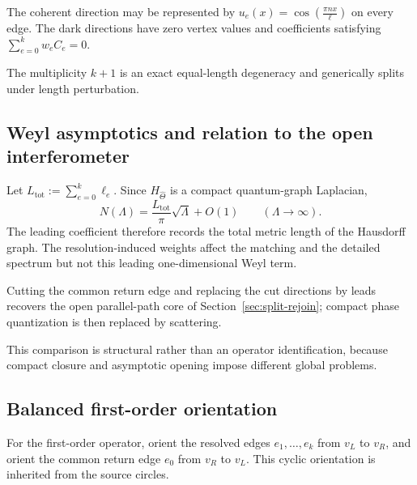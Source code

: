 \documentclass[11pt]{article}
\theoremstyle{plain}
\theoremstyle{definition}
\begin{document}
The coherent direction may be represented by \(u_e(x) = \cos \left( \frac{\pi n x}{\ell} \right)\) on every edge. The dark directions have zero vertex values and coefficients
satisfying
\(\sum_{e=0}^{k}w_eC_e=0\).

The multiplicity \(k+1\) is an exact equal-length degeneracy and generically splits under length perturbation.

\subsection{Weyl asymptotics and relation to the open interferometer}
\label{subsec:compact-theta-Weyl}
\label{subsec:compact-theta-cutting}
\label{subsec:compact-theta-open-comparison}

Let
\(L_{\mathrm{tot}} := \sum_{e=0}^{k}\ell_e\).
Since \(H_{\widehat\Theta}\) is a compact quantum-graph Laplacian,
\[
  N(\Lambda)
  =
  \frac{L_{\mathrm{tot}}}{\pi}
  \sqrt{\Lambda}
  +
  O(1)
  \qquad
  (\Lambda\to\infty).
\]
The leading coefficient therefore records the total metric length of the
Hausdorff graph. The resolution-induced weights affect the matching and the
detailed spectrum but not this leading one-dimensional Weyl term.

Cutting the common return edge and replacing the cut directions by leads recovers the open parallel-path core of Section~\ref{sec:split-rejoin}; compact phase quantization is then replaced by scattering.

This comparison is structural rather than an operator identification, because compact closure and asymptotic opening impose different global problems.

\subsection{Balanced first-order orientation}
\label{subsec:compact-theta-first-order-orientation}
\label{subsec:compact-theta-adjoint}

For the first-order operator, orient the resolved edges \(e_1,\ldots,e_k\) from \(v_L\) to \(v_R\), and orient the common return edge \(e_0\) from \(v_R\) to \(v_L\). This cyclic orientation is inherited from the
source circles.
\end{document}
